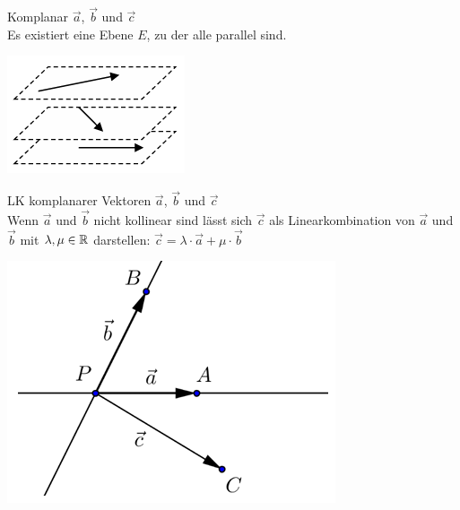 \begin{minipage}{0.8\linewidth}
\begin{definition}{Komplanar} $\vec{a}$, $\vec{b}$ und $\vec{c}$\\
    Es existiert eine Ebene $E$, zu der alle parallel sind.
\end{definition}
\end{minipage}
\begin{minipage}{0.15\linewidth}
    \includegraphics[width=\linewidth]{vec-komplanar.png}
\end{minipage}

\begin{minipage}{0.7\linewidth}
    \begin{theorem}{LK komplanarer Vektoren} $\vec{a}$, $\vec{b}$ und $\vec{c}$\\
        Wenn $\vec{a}$ und $\vec{b}$ nicht kollinear sind lässt sich $\vec{c}$ als Linearkombination von $\vec{a}$ und $\vec{b}$ mit $\lambda, \mu \in \mathbb{R}$ darstellen:
            {\large$\vec{c}=\lambda\cdot\vec{a}+\mu\cdot\vec{b}$}
    \end{theorem}
    \end{minipage}
    \begin{minipage}{0.25\linewidth}
        \includegraphics[width=\linewidth]{vec-kompl.png}
\end{minipage}


